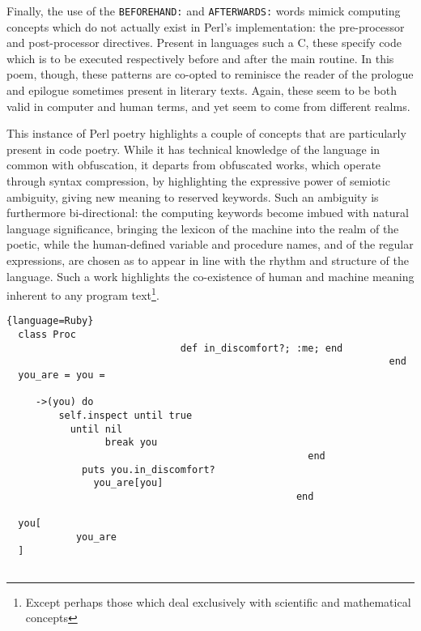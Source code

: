 \documentclass{article}
\begin{document}
Finally, the use of the \lstinline{BEFOREHAND:} and \lstinline{AFTERWARDS:} words mimick computing concepts which do not actually exist in Perl's implementation: the pre-processor and post-processor directives. Present in languages such a C, these specify code which is to be executed respectively before and after the main routine. In this poem, though, these patterns are co-opted to reminisce the reader of the prologue and epilogue sometimes present in literary texts. Again, these seem to be both valid in computer and human terms, and yet seem to come from different realms.

This instance of Perl poetry highlights a couple of concepts that are particularly present in code poetry. While it has technical knowledge of the language in common with obfuscation, it departs from obfuscated works, which operate through syntax compression, by highlighting the expressive power of semiotic ambiguity, giving new meaning to reserved keywords. Such an ambiguity is furthermore bi-directional: the computing keywords become imbued with natural language significance, bringing the lexicon of the machine into the realm of the poetic, while the human-defined variable and procedure names, and of the regular expressions, are chosen as to appear in line with the rhythm and structure of the language. Such a work highlights the co-existence of human and machine meaning inherent to any program text\footnote{Except perhaps those which deal exclusively with scientific and mathematical concepts}.

\pagebreak

\linespread{1.00}\selectfont
\begin{lstlisting}{language=Ruby}
  class Proc
                              def in_discomfort?; :me; end
                                                                  end
  you_are = you = 
     
     ->(you) do
         self.inspect until true
           until nil
                 break you
                                                    end
             puts you.in_discomfort?
               you_are[you]
                                                  end
  
  you[
            you_are
  ]
  
\end{lstlisting}
\linespread{1.50}\selectfont
\normalfont
\end{document}
